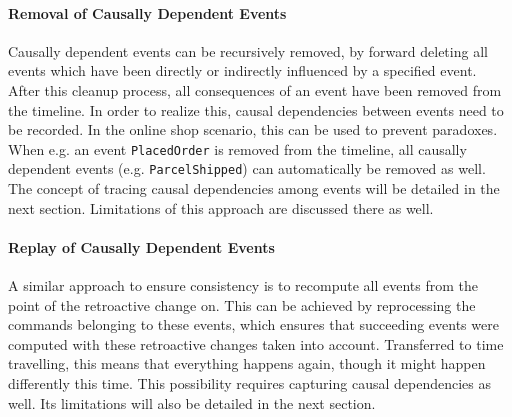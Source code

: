 \paragraph{Removal of Causally Dependent Events}
Causally dependent events can be recursively removed, by forward deleting all 
events which have been directly or indirectly influenced by a specified event. 
After this cleanup process, all consequences of an event have been removed from 
the timeline.
In order to realize this, causal dependencies between events need to be recorded. 
In the online shop scenario, this can be used to prevent paradoxes. When e.g. an 
event \texttt{PlacedOrder} is removed from the timeline, all causally dependent 
events (e.g. \texttt{ParcelShipped}) can automatically be removed as well.
The concept of tracing causal dependencies among events will be detailed 
in the next section. Limitations of this approach are discussed there as well.

\paragraph{Replay of Causally Dependent Events}
A similar approach to ensure consistency is to recompute all events from the
point of the retroactive change on. 
This can be achieved by reprocessing the commands belonging to these events,
which ensures that succeeding events were computed with these retroactive 
changes taken into account. Transferred to time travelling, this means that 
everything happens again, though it might happen differently this time.
This possibility requires capturing causal dependencies as well. 
Its limitations will also be detailed in the next section.

